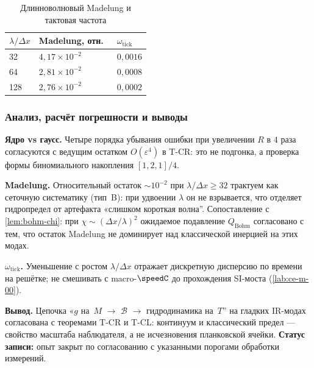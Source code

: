 \begin{table}[htbp]
\centering
\small
\caption{Длинноволновый Madelung и тактовая частота}
\label{tab:exp-ce-m-01-mad}
\begin{tabular}{@{}lll@{}}
\toprule
$\lambda/\Delta x$ & Madelung, отн.\ & $\omega_{\mathrm{tick}}$ \\
\midrule
32 & $4{,}17\times 10^{-2}$ & $0{,}0016$ \\
64 & $2{,}81\times 10^{-2}$ & $0{,}0008$ \\
128 & $2{,}76\times 10^{-2}$ & $0{,}0002$ \\
\bottomrule
\end{tabular}
\end{table}

\subsubsection*{Анализ, расчёт погрешности и выводы}
\textbf{Ядро vs гаусс.}
Четыре порядка убывания ошибки при увеличении $R$ в $4$ раза согласуются с ведущим остатком $O(\varepsilon^4)$ в T-CR:
это не подгонка, а проверка формы биномиального накопления $[1,2,1]/4$.

\textbf{Madelung.}
Относительный остаток $\sim 10^{-2}$ при $\lambda/\Delta x\ge 32$ трактуем как сеточную систематику (тип~B): при удвоении $\lambda$ он не взрывается,
что отделяет гидропредел от артефакта «слишком короткая волна''.
Сопоставление с \cref{lem:bohm-chi}: при $\chi\sim (\Delta x/\lambda)^2$ ожидаемое подавление $Q_{\mathrm{Bohm}}$ согласовано с тем,
что остаток Madelung не доминирует над классической инерцией на этих модах.

\textbf{$\omega_{\mathrm{tick}}$.}
Уменьшение с ростом $\lambda/\Delta x$ отражает дискретную дисперсию по времени на решётке; не смешивать с macro-$\speedC$ до прохождения SI-моста (\cref{lab:ce-m-00}).

\textbf{Вывод.}
Цепочка «$g$ на~$M$ $\to$ $\mathcal{B}$ $\to$ гидродинамика на~$T$'' на гладких IR-модах согласована с теоремами T-CR и T-CL:
континуум и классический предел --- свойство масштаба наблюдателя, а не исчезновения планковской ячейки.
\textbf{Статус записи:} опыт закрыт по согласованию с указанными порогами обработки измерений.
